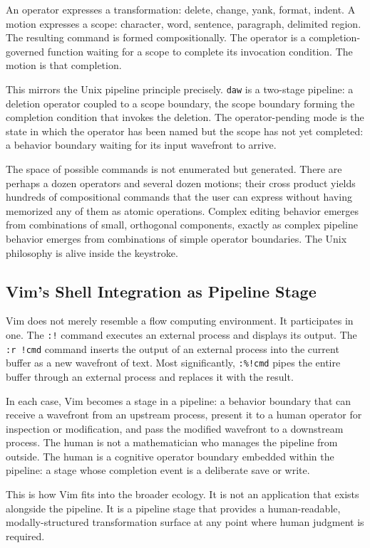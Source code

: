 \documentclass[12pt, a4paper]{article}
\begin{document}
An operator expresses a transformation: delete, change, yank,
format, indent. A motion expresses a scope: character, word,
sentence, paragraph, delimited region. The resulting command is
formed compositionally. The operator is a completion-governed
function waiting for a scope to complete its invocation condition.
The motion is that completion.

This mirrors the Unix pipeline principle precisely. \texttt{daw}
is a two-stage pipeline: a deletion operator coupled to a scope
boundary, the scope boundary forming the completion condition
that invokes the deletion. The operator-pending mode is the
state in which the operator has been named but the scope has
not yet completed: a behavior boundary waiting for its input
wavefront to arrive.

The space of possible commands is not enumerated but generated.
There are perhaps a dozen operators and several dozen motions;
their cross product yields hundreds of compositional commands
that the user can express without having memorized any of them
as atomic operations. Complex editing behavior emerges from
combinations of small, orthogonal components, exactly as complex
pipeline behavior emerges from combinations of simple operator
boundaries. The Unix philosophy is alive inside the keystroke.

\subsection{Vim's Shell Integration as Pipeline Stage}

Vim does not merely resemble a flow computing environment. It
participates in one. The \texttt{:!} command executes an external
process and displays its output. The \texttt{:r~!cmd} command
inserts the output of an external process into the current buffer
as a new wavefront of text. Most significantly, \texttt{:\%!cmd}
pipes the entire buffer through an external process and replaces
it with the result.

In each case, Vim becomes a stage in a pipeline: a behavior
boundary that can receive a wavefront from an upstream process,
present it to a human operator for inspection or modification,
and pass the modified wavefront to a downstream process. The
human is not a mathematician who manages the pipeline from
outside. The human is a cognitive operator boundary embedded
within the pipeline: a stage whose completion event is a
deliberate save or write.

This is how Vim fits into the broader ecology. It is not an
application that exists alongside the pipeline. It is a
pipeline stage that provides a human-readable, modally-structured
transformation surface at any point where human judgment is
required.
\end{document}
